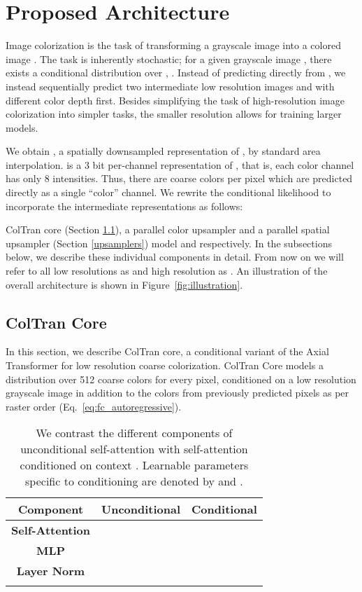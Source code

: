 \documentclass{article} \usepackage{iclr2021_conference,times}
\begin{document}
\section{Proposed Architecture}

Image colorization is the task of transforming a grayscale image  into a colored image . The task is inherently stochastic; for a given grayscale image , there exists a conditional distribution over , . Instead of predicting  directly from , we instead sequentially predict two intermediate low resolution images  and  with different color depth first. Besides simplifying the task of high-resolution image colorization into simpler tasks, the smaller resolution allows for training larger models.

We obtain , a spatially downsampled representation of , by standard area interpolation.  is a 3 bit per-channel representation of , that is, each color channel has only 8 intensities. Thus, there are  coarse colors per pixel which are predicted directly as a single ``color'' channel. We rewrite the conditional likelihood  to incorporate the intermediate representations as follows:

ColTran core (Section \ref{cat}), a parallel color upsampler and a parallel spatial upsampler (Section \ref{upsamplers}) model  and  respectively. In the subsections below, we describe these individual components in detail. From now on we will refer to all low resolutions as  and high resolution as . An illustration of the overall architecture is shown in Figure~\ref{fig:illustration}.





\subsection{ColTran Core}
\label{cat}

In this section, we describe ColTran core, a conditional variant of the Axial Transformer \citep{ho2019axial} for low resolution coarse colorization. ColTran Core models a distribution  over 512 coarse colors for every pixel, conditioned on a low resolution grayscale image in addition to the colors from previously predicted pixels as per raster order (Eq.~\ref{eq:fc_autoregressive}). 

\begin{table}
\centering
\small
\begin{tabular}{c  c  c}
\hline \addlinespace[0.1cm]
\textbf{Component} & \textbf{Unconditional} & \textbf{Conditional} \\
\hline \addlinespace[0.1cm]
\textbf{Self-Attention} &
 &
 \\
\addlinespace[0.1cm]
\hline \addlinespace[0.1cm]
\textbf{MLP} &
&
 \\
\addlinespace[0.1cm]
\hline \addlinespace[0.1cm]
\textbf{Layer Norm} &
&
 \\
\addlinespace[0.1cm]
\hline
\end{tabular}
\caption{We contrast the different components of unconditional self-attention with self-attention conditioned on context . Learnable parameters specific to conditioning are denoted by  and .}
\label{tab:cond_trans}
\end{table}
\end{document}
